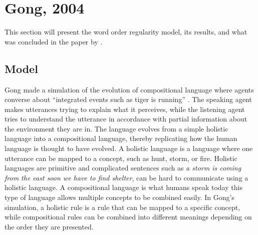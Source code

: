 
\section{Gong, 2004}\label{sec:Gong}
This section will present the word order regularity model, its results, and what was concluded in the paper by \citet{gong2004computational}. 

\subsection{Model}
Gong made a simulation of the evolution of compositional language  where agents converse about ``integrated events such as tiger is running'' \citep[Section 3]{gong2004computational}. The speaking agent makes utterances trying to explain what it perceives, while the listening agent tries to understand the utterance in accordance with partial information about the environment they are in. The language evolves from a simple holistic language into a compositional language, thereby replicating how the human language is thought to have evolved. A holistic language is a language where one utterance can be mapped to a concept, such as hunt, storm, or fire. Holistic languages are primitive and complicated sentences such as \textit{a storm is coming from the east soon we have to find shelter}, can be hard to communicate using a holistic language. A compositional language is what humans speak today this type of language allows multiple concepts to be combined easily. In Gong's simulation, a holistic rule is a rule that can be mapped to a specific concept, while compositional rules can be combined into different meanings depending on the order they are presented.    

